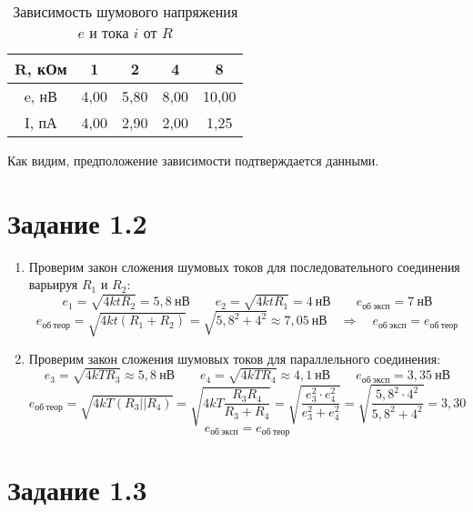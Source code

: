 \begin{enumerate}
	\begin{table}[!h]
		\centering
		\begin{tabular}{|c|c|c|c|c|}
			\hline
			R, кОм & 1    & 2    & 4    & 8     \\ \hline
			e, нВ  & 4,00 & 5,80 & 8,00 & 10,00 \\ \hline
			I, пА  & 4,00 & 2,90 & 2,00 & 1,25  \\ \hline
		\end{tabular}
		\caption{Зависимость шумового напряжения $e$ и тока $i$ от $R$}
		\label{tab:table_2}
	\end{table}

	Как видим, предположение зависимости подтверждается данными.\\

\end{enumerate}

\section*{Задание 1.2}

\begin{enumerate}
	\item Проверим закон сложения шумовых токов для последовательного соединения варьируя $R_1$ и $R_2$:
		\[
			e_1 = \sqrt{4ktR_2} = 5,8 \ нВ \quad \quad e_2 = \sqrt{4ktR_1} = 4 \ нВ \quad \quad e_{об \ эксп} = 7 \ нВ
		\]
		\[
			e_{об \ теор} = \sqrt{4kt(R_1 + R_2)} = \sqrt{5,8^2 + 4^2} \approx 7,05 \ нВ \quad \Rightarrow \quad \boxed{e_{об \ эксп} = e_{об \ теор}}
		\]
	
	\item Проверим закон сложения шумовых токов для параллельного соединения:
	\[
		e_3 = \sqrt{4kTR_3} \approx 5,8 \ нВ \quad \quad e_4 = \sqrt{4kTR_4} \approx 4,1 \ нВ \quad \quad e_{об \ эксп} = 3,35 \ нВ
	\]
	\[
		e_{об \ теор} = \sqrt{4kT (R_3 || R_4)} = \sqrt{4kT \frac{R_3 R_4}{R_3 + R_4}} = \sqrt{\frac{e_3^2 \cdot e_4^2}{e_3^2 + e_4^2}} = \sqrt{\frac{5,8^2 \cdot 4^2}{5,8^2 + 4^2}} = 3,30
	\]
	\[
		\boxed{e_{об \ эксп} = e_{об \ теор}}
	\]
	
\end{enumerate}

\newpage
\section*{Задание 1.3}

